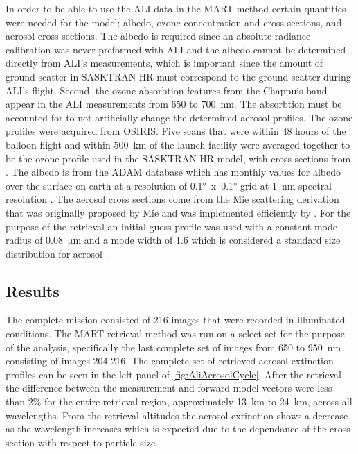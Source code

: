 \documentclass[12pt]{article}
\begin{document}
In order to be able to use the ALI data in the MART method certain quantities were needed for the model; albedo, ozone concentration and cross sections, and aerosol cross sections. The albedo is required since an absolute radiance calibration was never preformed with ALI and the albedo cannot be determined directly from ALI's measurements, which is important since the amount of ground scatter in SASKTRAN-HR must correspond to the ground scatter during ALI's flight. Second, the ozone absorbtion features from the Chappuis band appear in the ALI measurements from 650 to 700~nm. The absorbtion must be accounted for to not artificially change the determined aerosol profiles. The ozone profiles were acquired from OSIRIS. Five scans that were within 48 hours of the balloon flight and  within 500~km of the launch facility were averaged together to be the ozone profile used in the SASKTRAN-HR model, with cross sections from \cite{Burrows1999}. The albedo is from the ADAM database which has monthly values for albedo over the surface on earth at a resolution of 0.1\si{\degree}~x~0.1\si{\degree} grid at 1~nm spectral resolution \citep{Muller2013}. The aerosol cross sections come from the Mie scattering derivation that was originally proposed by Mie and was implemented efficiently by \cite{Wiscombe1980}. For the purpose of the retrieval an initial guess profile was used with a constant mode radius of 0.08~$\si{\micro\metre}$  and a mode width of 1.6 which is considered a standard size distribution for aerosol \citep{Deshler2003}.

\subsection{Results}

The complete mission consisted of 216 images that were recorded in illuminated conditions. The MART retrieval method was run on a select set for the purpose of the analysis, specifically the last complete set of images from 650 to 950~nm consisting of images 204-216. The complete set of retrieved aerosol extinction profiles can be seen in the left panel of \autoref{fig:AliAerosolCycle}. After the retrieval the difference between the measurement and forward model vectors were less than 2\% for the entire retrieval region, approximately 13~km to 24~km, across all wavelengths. From the retrieval altitudes the aerosol extinction shows a decrease as the wavelength increases which is expected due to the dependance of the cross section with respect to particle size.
\end{document}
